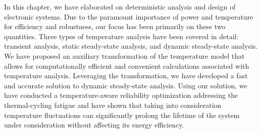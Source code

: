 In this chapter, we have elaborated on deterministic analysis and design of
electronic systems. Due to the paramount importance of power and temperature for
efficiency and robustness, our focus has been primarily on these two quantities.
Three types of temperature analysis have been covered in detail: transient
analysis, static steady-state analysis, and dynamic steady-state analysis. We
have proposed an auxiliary transformation of the temperature model that allows
for computationally efficient and convenient calculations associated with
temperature analysis. Leveraging the transformation, we have developed a fast
and accurate solution to dynamic steady-state analysis. Using our solution, we
have conducted a temperature-aware reliability optimization addressing the
thermal-cycling fatigue and have shown that taking into consideration
temperature fluctuations can significantly prolong the lifetime of the system
under consideration without affecting its energy efficiency.
